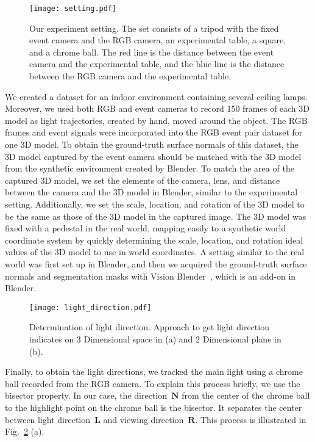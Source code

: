 \documentclass[preprint,12pt,authoryear]{elsarticle}
\begin{document}
\begin{figure}[t]
    \centering
    \texttt{[image: setting.pdf]}
    \caption{Our experiment setting. The set consists of a tripod with the fixed event camera and the RGB camera, an experimental table, a square, and a chrome ball. The red line is the distance between the event camera and the experimental table, and the blue line is the distance between the RGB camera and the experimental table.}
    \label{fig:setting}
\end{figure}
We created a dataset for an indoor environment containing several ceiling lamps. Moreover, we used both RGB and event cameras to record 150 frames of each 3D model as light trajectories, created by hand, moved around the object. The RGB frames and event signals were incorporated into the RGB event pair dataset for one 3D model. To obtain the ground-truth surface normals of this dataset, the 3D model captured by the event camera should be matched with the 3D model from the synthetic environment created by Blender. To match the area of the captured 3D model, we set the elements of the camera, lens, and distance between the camera and the 3D model in Blender, similar to the experimental setting. Additionally, we set the scale, location, and rotation of the 3D model to be the same as those of the 3D model in the captured image. The 3D model was fixed with a pedestal in the real world, mapping easily to a synthetic world coordinate system by quickly determining the scale, location, and rotation ideal values of the 3D model to use in world coordinates. A setting similar to the real world was first set up in Blender, and then we acquired the ground-truth surface normals and segmentation masks with Vision Blender~\citep{cartucho2020visionblender}, which is an add-on in Blender.

\begin{figure}[t]
    \centering
    \texttt{[image: light\_direction.pdf]}
    \caption{Determination of light direction. Approach to get light direction indicates on 3 Dimensional space in (a) and 2 Dimensional plane in (b).}
    \label{fig:lightdirection}
\end{figure}
Finally, to obtain the light directions, we tracked the main light using a chrome ball recorded from the RGB camera. To explain this process briefly, we use the bisector property. In our case, the direction~$\textbf{N}$ from the center of the chrome ball to the highlight point on the chrome ball is the bisector. It separates the center between light direction~$\textbf{L}$ and viewing direction~$\textbf{R}$. This process is illustrated in Fig.~\ref{fig:lightdirection} (a).
\end{document}

